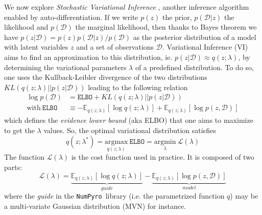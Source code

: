 \documentclass[twocolumn,twocolappendix,nofootinbib,iop]{openjournal}
\newcommand{\numpyro}{\texttt{NumPyro}}
\begin{document}
We now explore \textit{Stochastic Variational Inference} \citep{10.5555/2567709.2502622, 8588399}, another inference algorithm enabled by auto-differentiation. If we  write $p(z)$ the prior, $p(\mathcal{D}|z)$ the likelihood and $p(\mathcal{D})$ the marginal likelihood, then thanks to Bayes theorem we have $p(z|\mathcal{D})=p(z)p(\mathcal{D}|z)/p(\mathcal{D})$ as the posterior distribution of a model with latent variables $z$ and a set of observations $\mathcal{D}$. Variational Inference (VI) aims to find an approximation to this distribution, ie. $p(z|\mathcal{D}) \approx q(z;\lambda)$, by determining the variational parameters $\lambda$ of a predefined distribution. To do so, one uses the Kullback-Leibler divergence of the two distributions $KL(q(z;\lambda)||p(z|\mathcal{D}))$ leading to the following relation
\begin{align}
\log p(\mathcal{D}) &= \mathtt{ELBO} +  KL(q(z;\lambda)||p(z|\mathcal{D})) \label{eq-ELBO} \\
\mathrm{with} \ \mathtt{ELBO} &\equiv -\mathbb{E}_{q(z;\lambda)}\left[ \log q(z;\lambda)\right] + \mathbb{E}_{q(z;\lambda)}\left[ \log p(z,\mathcal{D}) \right] 
\end{align}
which defines the \textit{evidence lower bound} (aka ELBO) that one aims to maximize to get the $\lambda$ values. So, the optimal variational distribution satisfies
\begin{equation}
q(z;\lambda^\ast) = \underset{q(z;\lambda)}{\mathrm{argmax}}\  \mathtt{ELBO} = 
\underset{\lambda}{\mathrm{argmin}}\ \mathcal{L}(\lambda)
\end{equation}
The function $\mathcal{L}(\lambda)$ is the cost function used in practice. It is composed of two parts:
\begin{equation}
\mathcal{L}(\lambda) = \underbrace{\mathbb{E}_{q(z;\lambda)}\left[ \log q(z;\lambda)\right]}_{guide} - \underbrace{\mathbb{E}_{q(z;\lambda)}\left[ \log p(z,\mathcal{D}) \right]}_{model}
\label{eq-loss-svi-1}
\end{equation}
where the \textit{guide} in the \numpyro\ library (i.e. the parametrized function $q$) may be a multi-variate Gaussian distribution (MVN) for instance.
\end{document}
